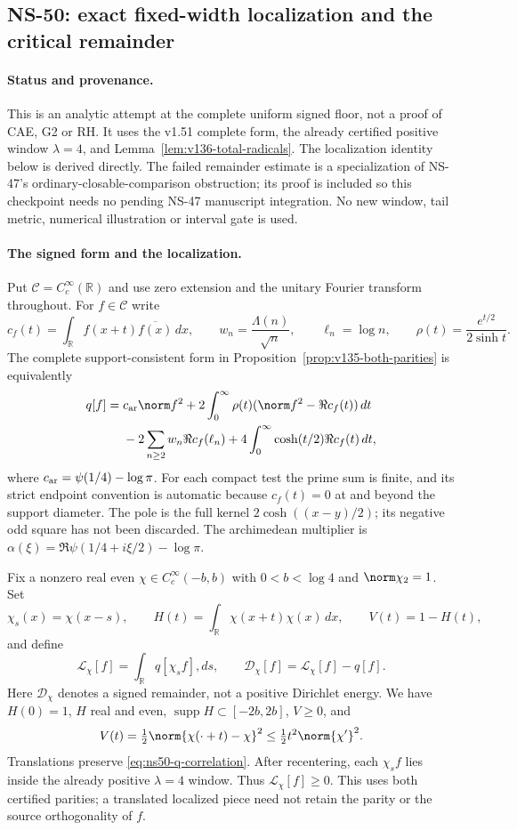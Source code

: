\subsection*{NS-50: exact fixed-width localization and the critical remainder}

\paragraph{Status and provenance.}
This is an analytic attempt at the complete uniform signed floor, not a
proof of CAE, G2 or RH. It uses the v1.51 complete form, the already
certified positive window $\lambda=4$, and
Lemma~\ref{lem:v136-total-radicals}. The localization identity below is
derived directly. The failed remainder estimate is a specialization of
NS-47's ordinary-closable-comparison obstruction; its proof is included
so this checkpoint needs no pending NS-47 manuscript integration. No
new window, tail metric, numerical illustration or interval gate is used.

\paragraph{The signed form and the localization.}
Put $\mathcal C=C_c^\infty(\mathbb R)$ and use zero extension and the
unitary Fourier transform throughout. For $f\in\mathcal C$ write
\[
 c_f(t)=\int_{\mathbb R} f(x+t)\overline{f(x)}\,dx,
 \qquad w_n=\frac{\Lambda(n)}{\sqrt n},\qquad \ell_n=\log n,
 \qquad \rho(t)=\frac{e^{t/2}}{2\sinh t}.
\]
The complete support-consistent form in
Proposition~\ref{prop:v135-both-parities} is equivalently
\begin{align}
 q[f]={}&c_{\rm ar}\norm f^2
       +2\int_0^\infty\rho(t)
                   (\norm f^2-\Re c_f(t))\,dt\notag\\
 &-2\sum_{n\ge2}w_n\Re c_f(\ell_n)
       +4\int_0^\infty\cosh(t/2)\Re c_f(t)\,dt,
 \label{eq:ns50-q-correlation}
\end{align}
where $c_{\rm ar}=\psi(1/4)-\log\pi$. For each compact test the
prime sum is finite, and its strict endpoint convention is automatic
because $c_f(t)=0$ at and beyond the support diameter. The pole is the
full kernel $2\cosh((x-y)/2)$; its negative odd square has not been
discarded. The archimedean multiplier is
$\alpha(\xi)=\Re\psi(1/4+i\xi/2)-\log\pi$.

Fix a nonzero real even $\chi\in C_c^\infty(-b,b)$ with
$0<b<\log4$ and $\norm\chi_2=1$. Set
\[
 \chi_s(x)=\chi(x-s),\qquad
 H(t)=\int_{\mathbb R}\chi(x+t)\chi(x)\,dx,
 \qquad V(t)=1-H(t),
\]
and define
\[
 \mathcal L_\chi[f]=\int_{\mathbb R}q[\chi_s f],ds,
 \qquad \mathcal D_\chi[f]=\mathcal L_\chi[f]-q[f].
\]
Here $\mathcal D_\chi$ denotes a signed remainder, not a positive
Dirichlet energy. We have $H(0)=1$, $H$ real and even,
$\operatorname{supp}H\subset[-2b,2b]$, $V\ge0$, and
\[
 V(t)=\tfrac12\norm{\chi(\cdot+t)-\chi}^2
       \le\tfrac12t^2\norm{\chi'}^2.
\]
Translations preserve \eqref{eq:ns50-q-correlation}. After recentering,
each $\chi_s f$ lies inside the already positive $\lambda=4$ window.
Thus $\mathcal L_\chi[f]\ge0$. This uses both certified parities;
a translated localized piece need not retain the parity or the source
orthogonality of $f$.

